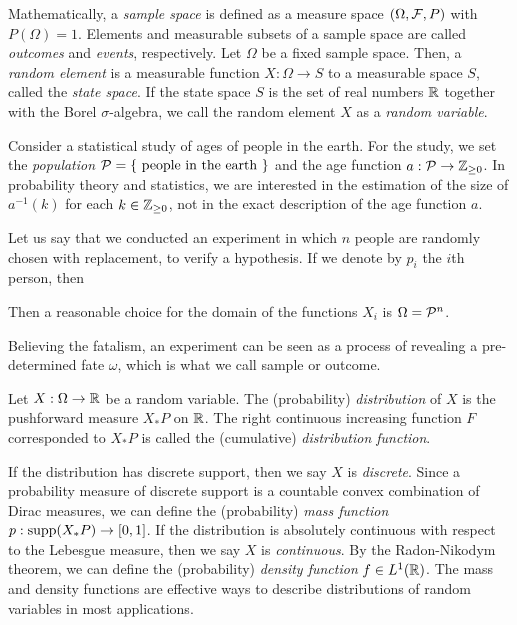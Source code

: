 \documentclass{../note}
\begin{document}
\begin{prb}
Mathematically, a \emph{sample space} is defined as a measure space $(\Omega,\mathcal{F},P)$ with $P(\Omega)=1$.
Elements and measurable subsets of a sample space are called \emph{outcomes} and \emph{events}, respectively.
Let $\Omega$ be a fixed sample space.
Then, a \emph{random element} is a measurable function $X:\Omega\to S$ to a measurable space $S$, called the \emph{state space}. 
If the state space $S$ is the set of real numbers $\mathbb{R}$ together with the Borel $\sigma$-algebra, we call the random element $X$ as a \emph{random variable}.

Consider a statistical study of ages of people in the earth.
For the study, we set the \emph{population} $\mathcal{P}=\{\text{ people in the earth }\}$ and the age function $a:\mathcal{P}\to\mathbb{Z}_{\ge0}$.
In probability theory and statistics, we are interested in the estimation of the size of $a^{-1}(k)$ for each $k\in\mathbb{Z}_{\ge0}$, not in the exact description of the age function $a$.

Let us say that we conducted an experiment in which $n$ people are randomly chosen with replacement, to verify a hypothesis.
If we denote by $p_i$ the $i$th person, then 

Then a reasonable choice for the domain of the functions $X_i$ is $\Omega=\mathcal{P}^n$.

Believing the fatalism, an experiment can be seen as a process of revealing a pre-determined fate $\omega$, which is what we call sample or outcome.


\begin{parts}
\item 
\end{parts}
\end{prb}
\begin{prb}
Let $X:\Omega\to\mathbb{R}$ be a random variable.
The (probability) \emph{distribution} of $X$ is the pushforward measure $X_*P$ on $\mathbb{R}$.
The right continuous increasing function $F$ corresponded to $X_*P$ is called the (cumulative) \emph{distribution function}.

If the distribution has discrete support, then we say $X$ is \emph{discrete}.
Since a probability measure of discrete support is a countable convex combination of Dirac measures, we can define the (probability) \emph{mass function} $p:\operatorname{supp}(X_*P)\to[0,1]$.
If the distribution is absolutely continuous with respect to the Lebesgue measure, then we say $X$ is \emph{continuous}.
By the Radon-Nikodym theorem, we can define the (probability) \emph{density function} $f\in L^1(\mathbb{R})$.
The mass and density functions are effective ways to describe distributions of random variables in most applications.
\begin{parts}
\item
\end{parts}
\end{prb}
\end{document}
